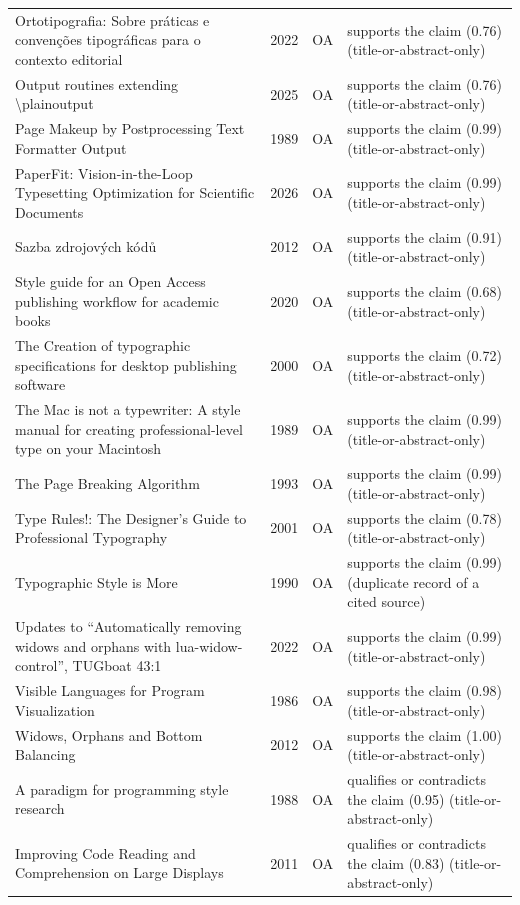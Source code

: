 \begin{longtable}{@{}%
  >{\raggedright\arraybackslash}p{}c%
  >{\raggedright\arraybackslash}p{}%
  >{\raggedright\arraybackslash}p{}@{}}
Ortotipografia: Sobre práticas e convenções tipográficas para o contexto editorial & 2022 & OA & supports the claim (0.76) (title-or-abstract-only) \\
Output routines extending \textbackslash{}plainoutput & 2025 & OA & supports the claim (0.76) (title-or-abstract-only) \\
Page Makeup by Postprocessing Text Formatter Output & 1989 & OA & supports the claim (0.99) (title-or-abstract-only) \\
PaperFit: Vision-in-the-Loop Typesetting Optimization for Scientific Documents & 2026 & OA & supports the claim (0.99) (title-or-abstract-only) \\
Sazba zdrojových kódů & 2012 & OA & supports the claim (0.91) (title-or-abstract-only) \\
Style guide for an Open Access publishing workflow for academic books & 2020 & OA & supports the claim (0.68) (title-or-abstract-only) \\
The Creation of typographic specifications for desktop publishing software & 2000 & OA & supports the claim (0.72) (title-or-abstract-only) \\
The Mac is not a typewriter: A style manual for creating professional-level type on your Macintosh & 1989 & OA & supports the claim (0.99) (title-or-abstract-only) \\
The Page Breaking Algorithm & 1993 & OA & supports the claim (0.99) (title-or-abstract-only) \\
Type Rules!: The Designer's Guide to Professional Typography & 2001 & OA & supports the claim (0.78) (title-or-abstract-only) \\
Typographic Style is More & 1990 & OA & supports the claim (0.99) (duplicate record of a cited source) \\
Updates to ``Automatically removing widows and orphans with lua-widow-control'', TUGboat 43:1 & 2022 & OA & supports the claim (0.99) (title-or-abstract-only) \\
Visible Languages for Program Visualization & 1986 & OA & supports the claim (0.98) (title-or-abstract-only) \\
Widows, Orphans and Bottom Balancing & 2012 & OA & supports the claim (1.00) (title-or-abstract-only) \\
A paradigm for programming style research & 1988 & OA & qualifies or contradicts the claim (0.95) (title-or-abstract-only) \\
Improving Code Reading and Comprehension on Large Displays & 2011 & OA & qualifies or contradicts the claim (0.83) (title-or-abstract-only) \\
\end{longtable}
\endgroup
